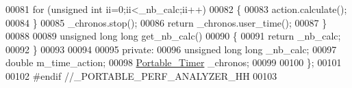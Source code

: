 \begin{DoxyCode}
00081     \textcolor{keywordflow}{for} (\textcolor{keywordtype}{unsigned} \textcolor{keywordtype}{int} ii=0;ii<\_nb\_calc;ii++)
00082     \{
00083       action.calculate();
00084     \}
00085     \_chronos.stop();
00086     \textcolor{keywordflow}{return} \_chronos.user\_time();
00087   \}
00088 
00089   \textcolor{keywordtype}{unsigned} \textcolor{keywordtype}{long} \textcolor{keywordtype}{long} get\_nb\_calc()
00090   \{
00091     \textcolor{keywordflow}{return} \_nb\_calc;
00092   \}
00093 
00094 
00095 \textcolor{keyword}{private}:
00096   \textcolor{keywordtype}{unsigned} \textcolor{keywordtype}{long} \textcolor{keywordtype}{long} \_nb\_calc;
00097   \textcolor{keywordtype}{double} m\_time\_action;
00098   \hyperlink{class_portable___timer}{Portable\_Timer} \_chronos;
00099 
00100 \};
00101 
00102 \textcolor{preprocessor}{#endif //\_PORTABLE\_PERF\_ANALYZER\_HH}
00103 
\end{DoxyCode}
